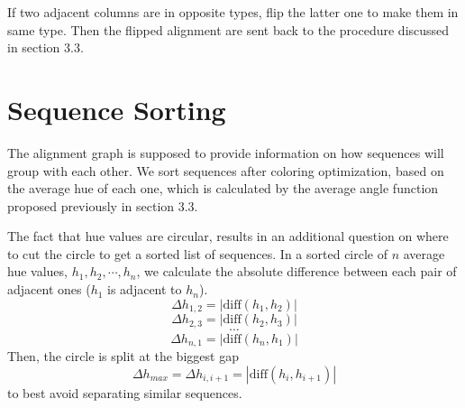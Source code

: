 If two adjacent columns are in opposite types, flip the latter one to make them in same type. Then the flipped alignment are sent back to the procedure discussed in section 3.3.

\section{Sequence Sorting}

The alignment graph is supposed to provide information on how sequences will group with each other. We sort sequences after coloring optimization, based on the average hue of each one, which is calculated by the average angle function proposed previously in section 3.3.

The fact that hue values are circular, results in an additional question on where to cut the circle to get a sorted list of sequences. In a sorted circle of $n$ average hue values, $h_1,h_2,\cdots,h_n$, we calculate the absolute difference between each pair of adjacent ones ($h_1$ is adjacent to $h_n$). $$\Delta h_{1,2}=|\mathrm{diff}(h_1,h_2)|$$ $$\Delta h_{2,3}=|\mathrm{diff}(h_2,h_3)|$$ $$\cdots$$ $$\Delta h_{n,1}=|\mathrm{diff}(h_n,h_1)|$$ Then, the circle is split at the biggest gap $$\Delta h_{max}=\Delta h_{i,i+1}=|\mathrm{diff}(h_i,h_{i+1})|$$ to best avoid separating similar sequences.
